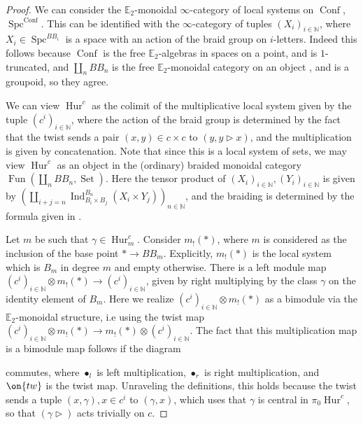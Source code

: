 \documentclass[12 pt]{amsart}
\theoremstyle{plain}
\theoremstyle{definition}
\theoremstyle{remark}
\numberwithin{equation}{section}
\DeclareMathOperator\Fun{Fun}
\DeclareMathOperator\Spc{Spc}
\DeclareMathOperator\Ind{Ind}
\DeclareMathOperator\Set{Set}
\DeclareMathOperator\Hur{Hur}
\DeclareMathOperator\Conf{Conf}
\newcommand\NN{\mathbb{N}}
\newcommand\EE{\mathbb{E}}
\begin{document}
\begin{proof}
	We can consider the $\EE_2$-monoidal $\infty$-category of local systems
	on $\Conf$, \linebreak$\Spc^{\Conf}$. This can be identified with the
	$\infty$-category of tuples $(X_i)_{i \in \NN}$, where $X_i\in \Spc^{BB_i}$ is a space with an action of the braid group on $i$-letters. Indeed this follows because $\Conf$ is the free $\EE_2$-algebras in spaces on a point, and is $1$-truncated, and $\coprod_n BB_n$ is the free $\EE_2$-monoidal category on an object \cite[Theorem 4]{joyal1986braided}, and is a groupoid, so they agree.

	We can view $\Hur^{c}$ as the colimit of the %
	multiplicative local system given by the tuple $(c^i)_{i \in \NN}$, 
	where the action of the braid group is determined by the fact that the
	twist sends a pair $(x,y) \in c\times c$ to $(y,y \triangleright x)$, 
	and the multiplication is given by concatenation. Note that since this is a local system of sets, we may view $\Hur^{c}$ as an object in the (ordinary) braided monoidal category $\Fun(\coprod_n BB_n,\Set)$. Here the tensor product of $(X_i)_{i \in \NN},(Y_i)_{i \in \NN}$ is given by $(\coprod_{i+j=n}\Ind^{B_n}_{B_i\times B_j}(X_i\times Y_j))_{n \in \NN}$, and the braiding is determined by the formula given in \cite[p7]{joyal1986braided}.
	
	Let $m$ be such that $\gamma \in \Hur_m^c$.
	Consider $m_!(*)$, where $m$ is considered as the inclusion of the base point $* \to BB_m$. Explicitly, $m_!(*)$ is the local system 
	which is $B_{m}$ in degree $m$ 
	and empty otherwise. There is a left module map $(c^i)_{i \in \NN} \otimes m_!(*)\to
	(c^i)_{i \in \NN}$, given by right multiplying by the class $\gamma$ on the identity element of $B_m$. Here we realize $(c^i)_{i \in \NN}\otimes m_!(*)$ as a bimodule via the $\EE_2$-monoidal structure, i.e using the twist map $(c^i)_{i \in \NN}\otimes m_!(*) \to m_!(*)\otimes (c^i)_{i \in \NN}$. The fact that this multiplication map is a bimodule map follows if the diagram
	
	\begin{center}
	\end{center}
	commutes, where $\bullet_l$ is left multiplication, $\bullet_r$ is right
	multiplication, and $\on{tw}$ is the twist map.
	Unraveling the definitions, this holds because the twist sends a tuple
	$(x,\gamma),x \in c^i$ to $(\gamma,x)$, which uses that $\gamma$ is central in $\pi_0\Hur^c$, so that $(\gamma\triangleright)$ acts trivially on $c$.
	

\end{proof}
\end{document}
